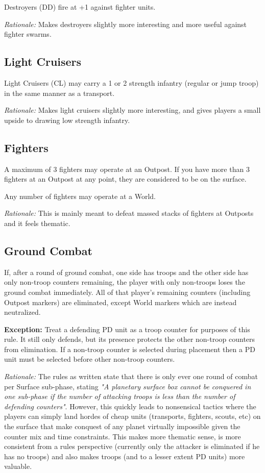 Destroyers (DD) fire at +1 against fighter units.

\textit{Rationale:} Makes destroyers slightly more interesting and more useful against fighter swarms.

\subsection{Light Cruisers}

Light Cruisers (CL) may carry a 1 or 2 strength infantry (regular or jump troop) in the same manner as a transport.

\textit{Rationale:} Makes light cruisers slightly more interesting, and gives players a small upside to drawing low strength infantry.

\subsection{Fighters}

A maximum of 3 fighters may operate at an Outpost. If you have more than 3 fighters at an Outpost at any point, they are considered to be on the surface.

Any number of fighters may operate at a World.

\textit{Rationale:} This is mainly meant to defeat massed stacks of fighters at Outposts and it feels thematic.

\subsection{Ground Combat}

If, after a round of ground combat, one side has troops and the other side has only non-troop counters remaining, the player with only non-troops loses the ground combat immediately. All of that player's remaining counters (including Outpost markers) are eliminated, except World markers which are instead neutralized.

\textbf{Exception:} Treat a defending PD unit as a troop counter for purposes of this rule. It still only defends, but its presence protects the other non-troop counters from elimination. If a non-troop counter is selected during placement then a PD unit must be selected before other non-troop counters.

\textit{Rationale:} The rules as written state that there is only ever one round of combat per Surface sub-phase, stating \textit{"A planetary surface box cannot be conquered in one sub-phase if the number of attacking troops is less than the number of defending counters"}. However, this quickly leads to nonsensical tactics where the players can simply land hordes of cheap units (transports, fighters, scouts, etc) on the surface that make conquest of any planet virtually impossible given the counter mix and time constraints. This makes more thematic sense, is more consistent from a rules perspective (currently only the attacker is eliminated if he has no troops) and also makes troops (and to a lesser extent PD units) more valuable.

